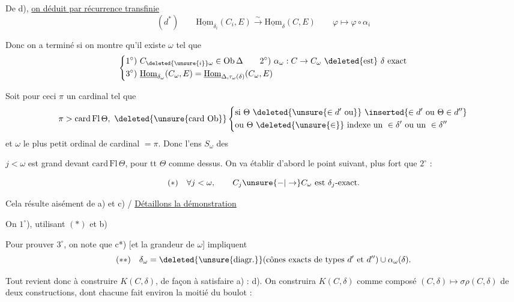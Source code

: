 
De d), \uline{on déduit par récurrence transfinie}
\[
(d^*)\qquad\boxed{\underline{\mathrm{Hom}}_{\delta_i}(C_i,E)\xrightarrow{\sim}\underline{\mathrm{Hom}}_\delta(C,E)}\qquad \varphi\longmapsto\varphi\circ\alpha_i
\]

Donc on a terminé si on montre qu'il existe $\omega$  tel que
\[
\left\{\begin{aligned}
1^\circ)&\ C_{\deleted{\unsure{i}}\omega}\in\mathrm{Ob}\,\Delta\qquad 2^\circ)\ \alpha_\omega:C\to C_\omega\ \deleted{\text{est}}\ \delta\text{ exact}\\
3^\circ)&\ \underline{\mathrm{Hom}}_{\delta_\omega}(C_\omega,E)=\underline{\mathrm{Hom}}_{\Delta,\tau_\omega(\delta)}(C_\omega,E)
\end{aligned}\right.
\]

 Soit pour ceci $\pi$ un cardinal tel que
\[
\pi>\mathrm{card}\,\mathrm{Fl}\,\Theta,\ \deleted{\unsure{\text{card Ob}}}\left\{\begin{aligned}
&\text{si }\Theta\ \deleted{\unsure{\in d'\text{ ou}}}\ \inserted{\in d'\text{ ou }\Theta\in d''}\\
&\text{ou }\Theta\ \deleted{\unsure{\in}}\text{ indexe un }\in\delta'\text{ ou un }\in\delta''
\end{aligned}\right.
\]
et $\omega$ le plus petit ordinal de cardinal $=\pi$. Donc l'ens $S_\omega$ des


$j<\omega$ est grand devant $\mathrm{card}\,\mathrm{Fl}\,\Theta$, pour tt $\Theta$ comme dessus. On va établir d'abord  le point suivant, plus fort que $2^\circ$ :

\[
(*)\quad\forall j<\omega,\qquad C_j\unsure{-|\to}C_\omega\text{ est }\delta_j\text{-exact.}
\]

Cela résulte aisément de a) et c)  / \uline{Détaillons la démonstration}

On   $1^\circ$), utilisant $(*)$ et b)

Pour prouver $3^\circ$, on note que  c*) [et la grandeur de $\omega$] impliquent
\[
(**)\quad\delta_\omega=\deleted{\unsure{\text{diagr.}}}(\text{cônes exacts de types }d'\text{ et }d'')\cup\alpha_\omega(\delta).
\]
\unsure{$\cup$}

Tout revient donc à construire $K(C,\delta)$, de façon à satisfaire a) : d). On construira  $K(C,\delta)$ comme composé $(C,\delta)\longmapsto\sigma\rho(C,\delta)$ de deux constructions, dont chacune fait environ la moitié du boulot :

